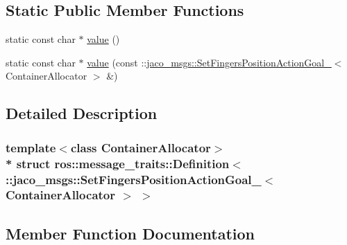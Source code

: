 \subsection*{Static Public Member Functions}
\begin{DoxyCompactItemize}
\item 
static const char $\ast$ \hyperlink{structros_1_1message__traits_1_1Definition_3_01_1_1jaco__msgs_1_1SetFingersPositionActionGoal___5076b256990d9b08a420815c0a2c9b99_adb59926ddd2c4db8857dd25d65d9e349}{value} ()
\item 
static const char $\ast$ \hyperlink{structros_1_1message__traits_1_1Definition_3_01_1_1jaco__msgs_1_1SetFingersPositionActionGoal___5076b256990d9b08a420815c0a2c9b99_a6279fce4e8c9e98ac3417bff9d7ead2a}{value} (const \+::\hyperlink{structjaco__msgs_1_1SetFingersPositionActionGoal__}{jaco\+\_\+msgs\+::\+Set\+Fingers\+Position\+Action\+Goal\+\_\+}$<$ Container\+Allocator $>$ \&)
\end{DoxyCompactItemize}


\subsection{Detailed Description}
\subsubsection*{template$<$class Container\+Allocator$>$\\*
struct ros\+::message\+\_\+traits\+::\+Definition$<$ \+::jaco\+\_\+msgs\+::\+Set\+Fingers\+Position\+Action\+Goal\+\_\+$<$ Container\+Allocator $>$ $>$}



\subsection{Member Function Documentation}
